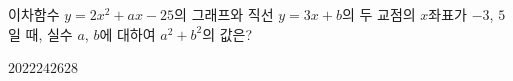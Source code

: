 이차함수 $y=2x^2+ax-25$의 그래프와 직선 $y=3x+b$의 두 교점의 $x$좌표가 $-3$, $5$일 때, 실수 $a$, $b$에 대하여 $a^2+b^2$의 값은?
\begin{choices32}{$20$}{$22$}{$24$}{$26$}{$28$}\end{choices32}

